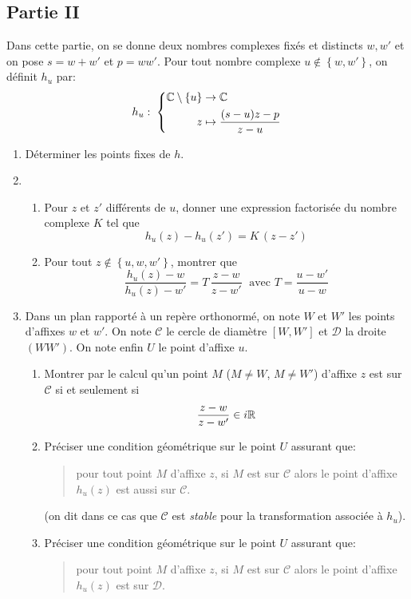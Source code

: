 \subsection*{Partie II}
Dans cette partie, on se donne deux nombres complexes fixés et distincts $w, w'$ et on pose $s= w + w'$ et $p = ww'$. Pour tout nombre complexe $u\notin\left\lbrace w, w'\right\rbrace$, on définit $h_u$ par:
\begin{displaymath}
h_u:\;
\left\lbrace 
  \begin{aligned}
    \mathbb{C}\setminus\left\lbrace u\right\rbrace &\rightarrow \mathbb{C} \\
     z &\mapsto \frac{(s-u)z -p}{z-u}
  \end{aligned}
\right. 
\end{displaymath}
\begin{enumerate}
  \item Déterminer les points fixes de $h$.
  \item 
\begin{enumerate}
  \item Pour $z$ et $z'$ différents de $u$, donner une expression factorisée du nombre complexe $K$ tel que 
  \begin{displaymath}
    h_u(z) - h_u(z') = K\,(z-z')
  \end{displaymath}
  
  \item Pour tout $z\notin\left\lbrace u, w, w'\right\rbrace$, montrer que 
\begin{displaymath}
  \frac{h_u(z) - w}{h_u(z) - w'} = T\, \frac{z-w}{z-w'} \;\text{ avec }
  T = \frac{u-w'}{u-w}
\end{displaymath}
\end{enumerate}
  
\item Dans un plan rapporté à un repère orthonormé, on note $W$ et $W'$ les points d'affixes $w$ et $w'$. On note $\mathcal{C}$ le cercle de diamètre $[W,W']$ et $\mathcal{D}$ la droite $(W W')$. On note enfin $U$ le point d'affixe $u$.  
\begin{enumerate}
  \item Montrer par le calcul qu'un point $M$ ($M\neq W$, $M\neq W'$) d'affixe $z$ est sur $\mathcal{C}$ si et seulement si
  \begin{displaymath}
    \frac{z-w}{z-w'} \in i\mathbb{R}
  \end{displaymath}

  \item Préciser une condition géométrique sur le point $U$ assurant que:
  \begin{quote}
pour tout point $M$ d'affixe $z$, si $M$ est sur $\mathcal{C}$ alors le point d'affixe $h_u(z)$ est aussi sur $\mathcal{C}$.    
  \end{quote}
 (on dit dans ce cas que $\mathcal{C}$ est \emph{stable} pour la transformation associée à $h_u$). 
  \item Préciser une condition géométrique sur le point $U$ assurant que:
  \begin{quote}
pour tout point $M$ d'affixe $z$, si $M$ est sur $\mathcal{C}$ alors le point d'affixe $h_u(z)$ est sur $\mathcal{D}$.    
  \end{quote}


\end{enumerate}
\end{enumerate}
